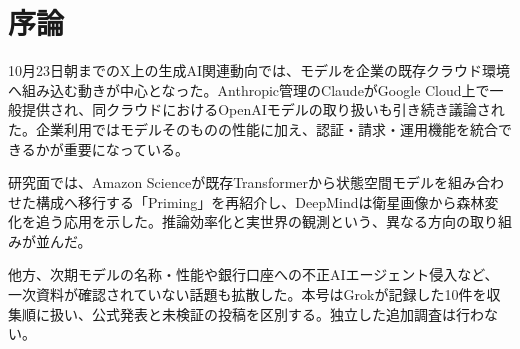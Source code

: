 \section*{序論}
10月23日朝までのX上の生成AI関連動向では、モデルを企業の既存クラウド環境へ組み込む動きが中心となった。Anthropic管理のClaudeがGoogle Cloud上で一般提供され、同クラウドにおけるOpenAIモデルの取り扱いも引き続き議論された。企業利用ではモデルそのものの性能に加え、認証・請求・運用機能を統合できるかが重要になっている。

研究面では、Amazon Scienceが既存Transformerから状態空間モデルを組み合わせた構成へ移行する「Priming」を再紹介し、DeepMindは衛星画像から森林変化を追う応用を示した。推論効率化と実世界の観測という、異なる方向の取り組みが並んだ。

他方、次期モデルの名称・性能や銀行口座への不正AIエージェント侵入など、一次資料が確認されていない話題も拡散した。本号はGrokが記録した10件を収集順に扱い、公式発表と未検証の投稿を区別する。独立した追加調査は行わない。
